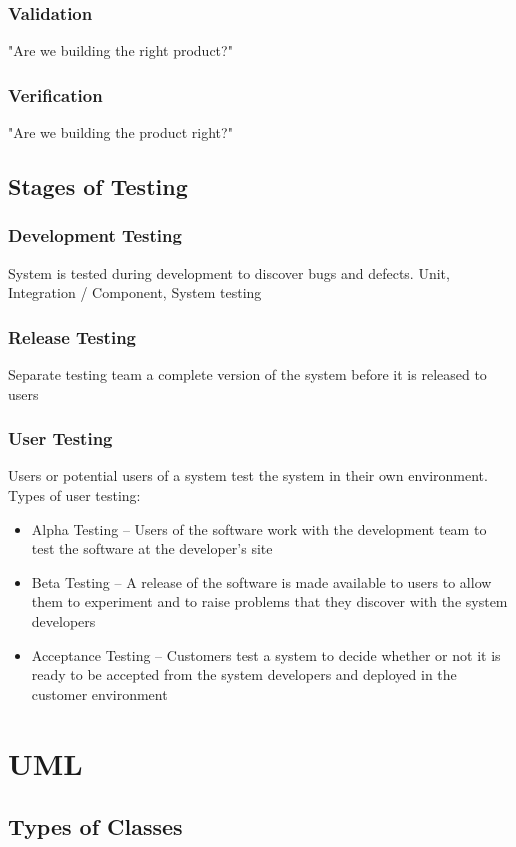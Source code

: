 \documentclass[10pt,a4paper]{article}
\begin{document}
\begin{landscape}
\begin{multicols}{3}
\subsubsection{Validation}
"Are we building the right product?"
\subsubsection{Verification}
"Are we building the product right?"
\subsection{Stages of Testing}
\subsubsection{Development Testing}
System is tested during development to discover bugs and defects. Unit, Integration / Component, System testing
\subsubsection{Release Testing}
Separate testing team a complete version of the system before it is released to users
\subsubsection{User Testing}
Users or potential users of a system test the system in their own environment. Types of user testing:
\begin{itemize}
    \item Alpha Testing -- Users of the software work with the development team to test the software at the developer's site
    \item Beta Testing -- A release of the software is made available to users to allow them to experiment and to raise problems that they discover with the system developers
    \item Acceptance Testing -- Customers test a system to decide whether or not it is ready to be accepted from the system developers and deployed in the customer environment
\end{itemize}

\section{UML}
\subsection{Types of Classes}

\end{multicols}
\end{landscape}
\end{document}
